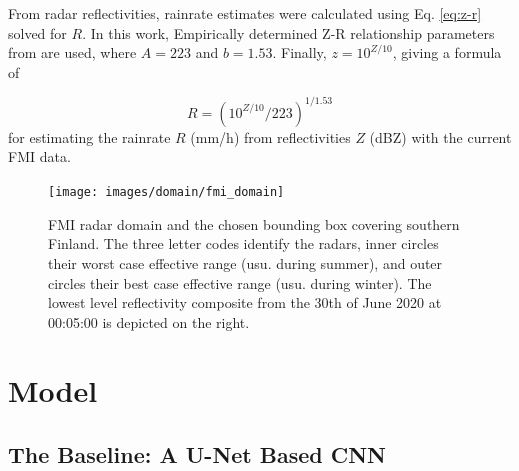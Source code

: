 



From radar reflectivities, rainrate estimates were calculated using Eq. \eqref{eq:z-r} solved for $R$. In this work, Empirically determined Z-R relationship parameters from \citet{leinonen_climatology_2012} are used, where $A=223$ and $b=1.53$. Finally, $z = 10^{Z / 10}$, giving a formula of

\begin{equation}
\label{eq:dbz_to_r}
R = (10^{Z / 10} / 223)^{1/1.53}
\end{equation}
%
for estimating the rainrate $R$ (mm/h) from reflectivities $Z$ (dBZ) with the current FMI data. 

\begin{figure}
	\centering
	\texttt{[image: images/domain/fmi\_domain]}
	\caption{FMI radar domain and the chosen bounding box covering southern Finland. The three letter codes identify the radars, inner circles their worst case effective range (usu. during summer), and outer circles their best case effective range (usu. during winter). The lowest level reflectivity composite from the 30th of June 2020 at 00:05:00 is depicted on the right.}
	\label{fig:domain}
\end{figure} 


\section{Model}

\subsection{The Baseline: A U-Net Based CNN}
\label{section:rainnet}


